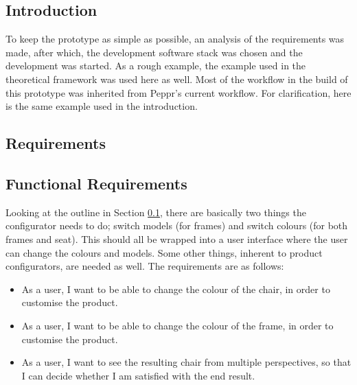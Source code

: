 \subsection{Introduction}
\label{sub:prototypeIntroduction}
To keep the prototype as simple as possible, an analysis of the requirements was made, after which, the development software stack was chosen and the development was started. As a rough example, the example used in the theoretical framework was used here as well. Most of the workflow in the build of this prototype was inherited from Peppr's current workflow. For clarification, here is the same example used in the introduction.


\subsection{Requirements}

\subsection{Functional Requirements}
Looking at the outline in Section \ref{sub:prototypeIntroduction}, there are basically two things the configurator needs to do; switch models (for frames) and switch colours (for both frames and seat). This should all be wrapped into a user interface where the user can change the colours and models. Some other things, inherent to product configurators, are needed as well. The requirements are as follows:

\begin{itemize}
	\item As a user, I want to be able to change the colour of the chair, in order to customise the product.
	\item As a user, I want to be able to change the colour of the frame, in order to customise the product.
	\item As a user, I want to see the resulting chair from multiple perspectives, so that I can decide whether I am satisfied with the end result.
\end{itemize}


